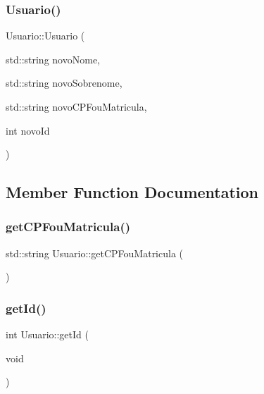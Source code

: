 \subsubsection{Usuario()\hspace{0.1cm}{\footnotesize\ttfamily [2/2]}}
{\footnotesize\ttfamily Usuario\+::\+Usuario (\begin{DoxyParamCaption}\item[{std\+::string}]{novo\+Nome,  }\item[{std\+::string}]{novo\+Sobrenome,  }\item[{std\+::string}]{novo\+C\+P\+Fou\+Matricula,  }\item[{int}]{novo\+Id }\end{DoxyParamCaption})\hspace{0.3cm}{\ttfamily [inline]}}



\subsection{Member Function Documentation}
\mbox{\label{class_usuario_ab3ea620c210576609be3d985e69ceada}} 
\subsubsection{get\+C\+P\+Fou\+Matricula()}
{\footnotesize\ttfamily std\+::string Usuario\+::get\+C\+P\+Fou\+Matricula (\begin{DoxyParamCaption}{ }\end{DoxyParamCaption})\hspace{0.3cm}{\ttfamily [inline]}}

\mbox{\label{class_usuario_a71fe841133c88c6f2c71a5225fd1cd5c}} 
\subsubsection{get\+Id()}
{\footnotesize\ttfamily int Usuario\+::get\+Id (\begin{DoxyParamCaption}\item[{void}]{ }\end{DoxyParamCaption})\hspace{0.3cm}{\ttfamily [inline]}}

\mbox{\label{class_usuario_a95cd963206ebacf43b033af966ef9a87}} 

